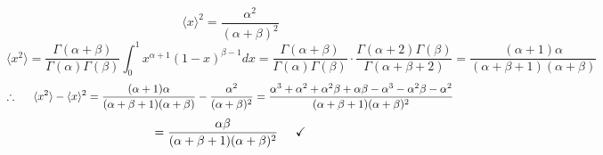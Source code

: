 \documentclass{article}
\begin{document}
\begin{enumerate}
\begin{enumerate}
        \\
        \[\langle x \rangle ^2 = \frac{\alpha^2}{(\alpha + \beta)^2}\]
        \[\langle x^2\rangle = \frac{\Gamma(\alpha + \beta)}{\Gamma(\alpha)\Gamma(\beta)}\int_{0}^{1}x^{\alpha + 1} (1-x)^{\beta - 1}dx = \frac{\Gamma(\alpha + \beta)}{\Gamma(\alpha)\Gamma(\beta)} \cdot \frac{\Gamma(\alpha + 2)\Gamma(\beta)}{\Gamma(\alpha + \beta + 2)} = \frac{(\alpha + 1)\alpha}{(\alpha + \beta + 1)(\alpha + \beta)}\]
        \[\therefore \hspace{5mm} \langle x^2 \rangle - \langle x \rangle ^2 = \frac{(\alpha + 1)\alpha}{(\alpha + \beta + 1)(\alpha + \beta)} - \frac{\alpha^2}{(\alpha + \beta)^2} = \frac{\alpha^3 + \alpha^2 + \alpha^2\beta + \alpha\beta - \alpha^3 - \alpha^2\beta-\alpha^2}{(\alpha + \beta + 1)(\alpha + \beta)^2}\]
        \[ = \frac{\alpha\beta}{(\alpha + \beta + 1)(\alpha + \beta)^2} \hspace{5mm} \checkmark\]
    \end{enumerate}
\end{enumerate}
\end{document}
